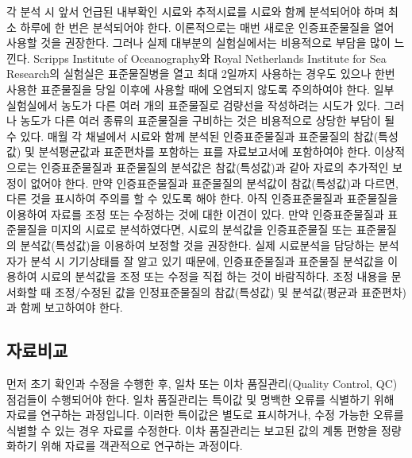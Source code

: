 \documentclass[
]{book}
\begin{document}
각 분석 시 앞서 언급된 내부확인 시료와 추적시료를 시료와 함께 분석되어야 하며 최소 하루에 한 번은 분석되어야 한다. 이론적으로는 매번 새로운 인증표준물질을 열어 사용할 것을 권장한다. 그러나 실제 대부분의 실험실에서는 비용적으로 부담을 많이 느낀다. Scripps Institute of Oceanography와 Royal Netherlands Institute for Sea Research의 실험실은 표준물질병을 열고 최대 2일까지 사용하는 경우도 있으나 한번 사용한 표준물질을 당일 이후에 사용할 때에 오염되지 않도록 주의하여야 한다.
일부 실험실에서 농도가 다른 여러 개의 표준물질로 검량선을 작성하려는 시도가 있다. 그러나 농도가 다른 여러 종류의 표준물질을 구비하는 것은 비용적으로 상당한 부담이 될 수 있다. 매월 각 채널에서 시료와 함께 분석된 인증표준물질과 표준물질의 참값(특성값) 및 분석평균값과 표준편차를 포함하는 표를 자료보고서에 포함하여야 한다. 이상적으로는 인증표준물질과 표준물질의 분석값은 참값(특성값)과 같아 자료의 추가적인 보정이 없어야 한다. 만약 인증표준물질과 표준물질의 분석값이 참값(특성값)과 다르면, 다른 것을 표시하여 주의를 할 수 있도록 해야 한다. 아직 인증표준물질과 표준물질을 이용하여 자료를 조정 또는 수정하는 것에 대한 이견이 있다. 만약 인증표준물질과 표준물질을 미지의 시료로 분석하였다면, 시료의 분석값을 인증표준물질 또는 표준물질의 분석값(특성값)을 이용하여 보정할 것을 권장한다. 실제 시료분석을 담당하는 분석자가 분석 시 기기상태를 잘 알고 있기 때문에, 인증표준물질과 표준물질 분석값을 이용하여 시료의 분석값을 조정 또는 수정을 직접 하는 것이 바람직하다. 조정 내용을 문서화할 때 조정/수정된 값을 인정표준물질의 참값(특성값) 및 분석값(평균과 표준편차)과 함께 보고하여야 한다.

\hypertarget{uxc790uxb8ccuxbe44uxad50}{%
\subsection{자료비교}\label{uxc790uxb8ccuxbe44uxad50}}

먼저 초기 확인과 수정을 수행한 후, 일차 또는 이차 품질관리(Quality Control, QC) 점검들이 수행되어야 한다. 일차 품질관리는 특이값 및 명백한 오류를 식별하기 위해 자료를 연구하는 과정입니다. 이러한 특이값은 별도로 표시하거나, 수정 가능한 오류를 식별할 수 있는 경우 자료를 수정한다. 이차 품질관리는 보고된 값의 계통 편향을 정량화하기 위해 자료를 객관적으로 연구하는 과정이다.
\end{document}
